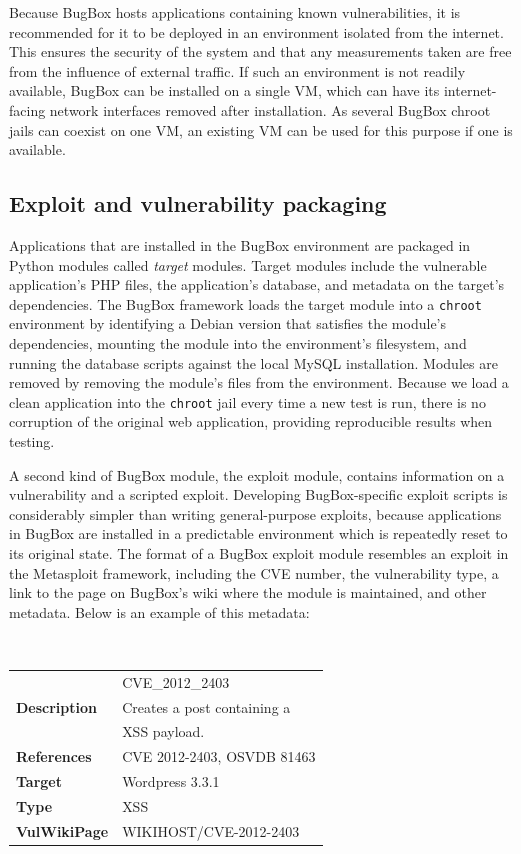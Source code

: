 \documentclass[letterpaper,twocolumn,10pt]{article}
\begin{document}
Because BugBox hosts applications containing known vulnerabilities, it is recommended for it to be deployed in an environment isolated from the internet. This ensures the security of the system and that any measurements taken are free from the influence of external traffic. If such an environment is not readily available, BugBox can be installed on a single VM, which can have its internet-facing network interfaces removed after installation. As several BugBox chroot jails can coexist on one VM, an existing VM can be used for this purpose if one is available.

\subsection{Exploit and vulnerability packaging}

Applications that are installed in the BugBox environment are packaged in Python modules called \textit{target} modules. Target modules include the vulnerable application's PHP files, the application's database, and metadata on the target's dependencies. The BugBox framework loads the target module into a \texttt{chroot} environment by identifying a Debian version that satisfies the module's dependencies, mounting the module into the environment's filesystem, and running the database scripts against the local MySQL installation. Modules are removed by removing the module's files from the environment. Because we load a clean application into the {\tt chroot} jail every time a new test is run, there is no corruption of the original web application, providing reproducible results when testing.

A second kind of BugBox module, the exploit module, contains information on a vulnerability and a scripted exploit. Developing BugBox-specific exploit scripts is considerably simpler than writing general-purpose exploits, because applications in BugBox are installed in a predictable environment which is repeatedly reset to its original state. The format of a BugBox exploit module resembles an exploit in the Metasploit framework, including the CVE number, the vulnerability type, a link to the page on BugBox's wiki where the module is maintained, and other metadata. Below is an example of this metadata:

\begin{minipage}{\textwidth}
{\tt \small
\begin{tabular} { l l }
\noindent{\bf Name}&CVE\_2012\_2403\\
{\bf Description}&Creates a post containing a\\& XSS payload.\\
{\bf References}&CVE 2012-2403, OSVDB 81463 \\
{\bf Target}&Wordpress 3.3.1\\
{\bf Type}&XSS\\
{\bf VulWikiPage}&WIKIHOST/CVE-2012-2403
\end{tabular}
}
\end{minipage}
\end{document}
